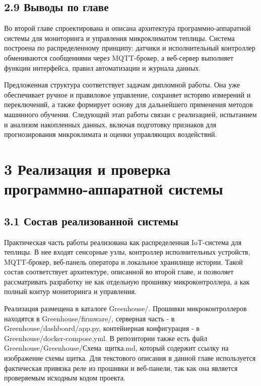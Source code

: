 \documentclass[a4paper,14pt]{extarticle}
\renewcommand{\texttt}[1]{\textnormal{#1}}
\begin{document}
\subsection{2.9 Выводы по
главе}\label{ux432ux44bux432ux43eux434ux44b-ux43fux43e-ux433ux43bux430ux432ux435}

Во второй главе спроектирована и описана архитектура
программно-аппаратной системы для мониторинга и управления микроклиматом
теплицы. Система построена по распределенному принципу: датчики и
исполнительный контроллер обмениваются сообщениями через MQTT-брокер, а
веб-сервер выполняет функции интерфейса, правил автоматизации и журнала
данных.

Предложенная структура соответствует задачам дипломной работы. Она уже
обеспечивает ручное и правиловое управление, сохраняет историю измерений
и переключений, а также формирует основу для дальнейшего применения
методов машинного обучения. Следующий этап работы связан с реализацией,
испытанием и анализом накопленных данных, включая подготовку признаков
для прогнозирования микроклимата и оценки управляющих воздействий.

\section{3 Реализация и проверка программно-аппаратной
системы}\label{ux440ux435ux430ux43bux438ux437ux430ux446ux438ux44f-ux438-ux43fux440ux43eux432ux435ux440ux43aux430-ux43fux440ux43eux433ux440ux430ux43cux43cux43dux43e-ux430ux43fux43fux430ux440ux430ux442ux43dux43eux439-ux441ux438ux441ux442ux435ux43cux44b}

\subsection{3.1 Состав реализованной
системы}\label{ux441ux43eux441ux442ux430ux432-ux440ux435ux430ux43bux438ux437ux43eux432ux430ux43dux43dux43eux439-ux441ux438ux441ux442ux435ux43cux44b}

Практическая часть работы реализована как распределенная IoT-система для
теплицы. В нее входят сенсорные узлы, контроллер исполнительных
устройств, MQTT-брокер, веб-панель оператора и локальное хранилище
истории. Такой состав соответствует архитектуре, описанной во второй
главе, и позволяет рассматривать разработку не как отдельную прошивку
микроконтроллера, а как полный контур мониторинга и управления.

Реализация размещена в каталоге \texttt{Greenhouse/}. Прошивки
микроконтроллеров находятся в \texttt{Greenhouse/firmware/}, серверная
часть - в \texttt{Greenhouse/dashboard/app.py}, контейнерная
конфигурация - в \texttt{Greenhouse/docker-compose.yml}. В репозитории
также есть файл \texttt{Greenhouse/Greenhouse/Схема\ щитка.md}, который
содержит ссылку на изображение схемы щитка. Для текстового описания в
данной главе используется фактическая привязка реле из прошивки и
веб-панели, так как она является проверяемым исходным кодом проекта.
\end{document}

